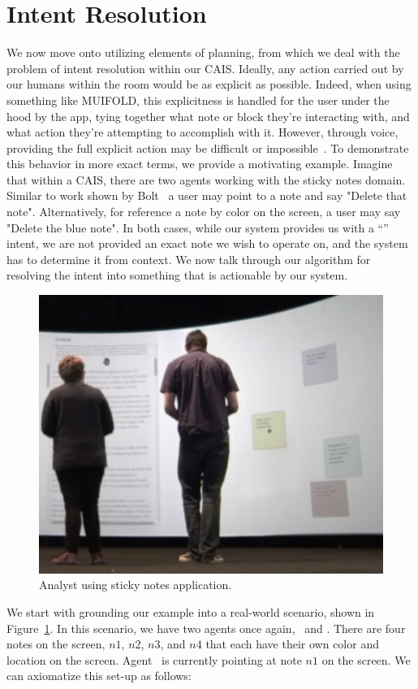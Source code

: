 \section{Intent Resolution}

We now move onto utilizing elements of planning, from which we deal with
the problem of intent resolution within our CAIS.
Ideally, any action carried out by our humans within the room would be as explicit
as possible. Indeed, when using something like MUIFOLD, this explicitness is handled for
the user under the hood by the app, tying together what note or block they're interacting
with, and what action they're attempting to accomplish with it. However, through voice,
providing the full explicit action may be difficult or 
impossible~\cite{kephart_embodied_2019}. To demonstrate this
behavior in more exact terms, we provide a motivating example. Imagine that within a CAIS, there
are two agents working with the sticky notes domain. Similar to work shown by
Bolt~\cite{bolt_put-that-there:_1980} a user may point to a note and say "Delete that
note". Alternatively, for reference a note by color on the screen, a user may say "Delete the blue
note". In both cases, while our system provides us with a ``\delete'' intent, we are not
provided an exact note we wish to operate on, and the system has to determine it from
context. We now talk through our algorithm for resolving the intent into something that
is actionable by our system.

\begin{figure}
\centering
  \includegraphics[width=0.7\columnwidth]{chapters/06_planning/figures/intent_sticky_notes.png}
  \caption{Analyst using sticky notes application.}
  \label{fig:intent_sticky_notes}
\end{figure}

We start with grounding our example into a real-world scenario, shown in
Figure~\ref{fig:intent_sticky_notes}. In this scenario, we have two agents once again, \humana\ and
\humanb. There are four notes on the screen, $n1$, $n2$, $n3$, and $n4$ that each have their own color
and location on the screen. Agent \humanb\ is currently pointing at note $n1$ on the screen. We can
axiomatize this set-up as follows:

